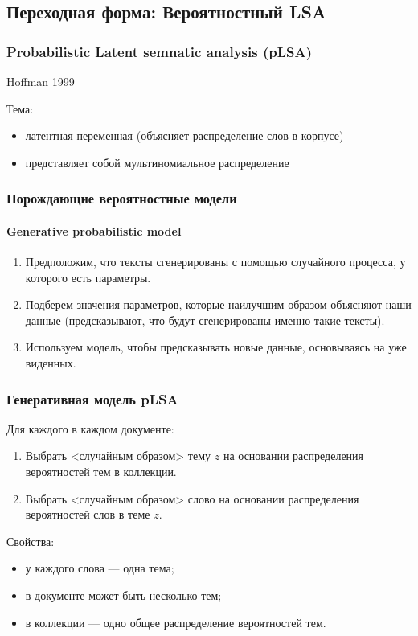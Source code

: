 \documentclass[10pt,svgnames]{beamer}
\begin{document}
\subsection{Переходная форма: Вероятностный LSA}

\begin{frame}
  \frametitle{Probabilistic Latent semnatic analysis (pLSA)}
  Hoffman 1999

  Тема:
  \begin{itemize}
  \item \alert{латентная} переменная (объясняет распределение слов в корпусе)
  \item представляет собой мультиномиальное распределение
  \end{itemize}
\end{frame}

\begin{frame}
  \frametitle{Порождающие вероятностные модели}
  \framesubtitle{Generative probabilistic model}
  \begin{enumerate}
  \item Предположим, что тексты сгенерированы с помощью случайного
    процесса, у которого есть \alert{параметры}.
  \item \alert{Подберем} значения параметров, которые наилучшим
    образом объясняют наши данные (предсказывают, что будут
    сгенерированы именно такие тексты).
  \item Используем модель, чтобы \alert{предсказывать} новые данные,
    основываясь на уже виденных.
  \end{enumerate}
\end{frame}

\begin{frame}
  \frametitle{Генеративная модель pLSA}
    Для каждого  в каждом документе:
  \begin{enumerate}
  \item Выбрать <случайным образом> тему $z$ на основании
    распределения вероятностей тем в коллекции.
  \item Выбрать <случайным образом> слово на основании распределения
    вероятностей слов в теме $z$.
  \end{enumerate}
  Свойства:
  \begin{itemize}
  \item у каждого слова — одна тема;
  \item в документе может быть несколько тем;
  \item в коллекции — одно общее распределение вероятностей тем.
  \end{itemize}
\end{frame}
\end{document}
